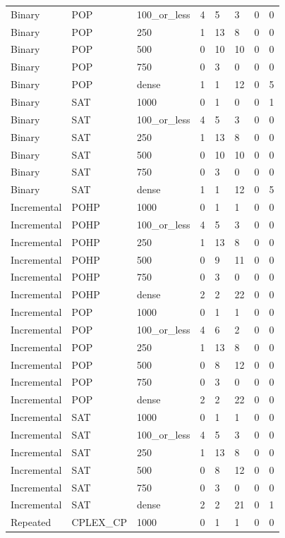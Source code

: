 \begin{table}[htbp]
\begin{tabular}{llllllll}
Binary & POP & 100\_or\_less & 4 & 5 & 3 & 0 & 0 \\
Binary & POP & 250 & 1 & 13 & 8 & 0 & 0 \\
Binary & POP & 500 & 0 & 10 & 10 & 0 & 0 \\
Binary & POP & 750 & 0 & 3 & 0 & 0 & 0 \\
Binary & POP & dense & 1 & 1 & 12 & 0 & 5 \\
Binary & SAT & 1000 & 0 & 1 & 0 & 0 & 1 \\
Binary & SAT & 100\_or\_less & 4 & 5 & 3 & 0 & 0 \\
Binary & SAT & 250 & 1 & 13 & 8 & 0 & 0 \\
Binary & SAT & 500 & 0 & 10 & 10 & 0 & 0 \\
Binary & SAT & 750 & 0 & 3 & 0 & 0 & 0 \\
Binary & SAT & dense & 1 & 1 & 12 & 0 & 5 \\
Incremental & POHP & 1000 & 0 & 1 & 1 & 0 & 0 \\
Incremental & POHP & 100\_or\_less & 4 & 5 & 3 & 0 & 0 \\
Incremental & POHP & 250 & 1 & 13 & 8 & 0 & 0 \\
Incremental & POHP & 500 & 0 & 9 & 11 & 0 & 0 \\
Incremental & POHP & 750 & 0 & 3 & 0 & 0 & 0 \\
Incremental & POHP & dense & 2 & 2 & 22 & 0 & 0 \\
Incremental & POP & 1000 & 0 & 1 & 1 & 0 & 0 \\
Incremental & POP & 100\_or\_less & 4 & 6 & 2 & 0 & 0 \\
Incremental & POP & 250 & 1 & 13 & 8 & 0 & 0 \\
Incremental & POP & 500 & 0 & 8 & 12 & 0 & 0 \\
Incremental & POP & 750 & 0 & 3 & 0 & 0 & 0 \\
Incremental & POP & dense & 2 & 2 & 22 & 0 & 0 \\
Incremental & SAT & 1000 & 0 & 1 & 1 & 0 & 0 \\
Incremental & SAT & 100\_or\_less & 4 & 5 & 3 & 0 & 0 \\
Incremental & SAT & 250 & 1 & 13 & 8 & 0 & 0 \\
Incremental & SAT & 500 & 0 & 8 & 12 & 0 & 0 \\
Incremental & SAT & 750 & 0 & 3 & 0 & 0 & 0 \\
Incremental & SAT & dense & 2 & 2 & 21 & 0 & 1 \\
Repeated & CPLEX\_CP & 1000 & 0 & 1 & 1 & 0 & 0 \\

\end{tabular}
\end{table}
